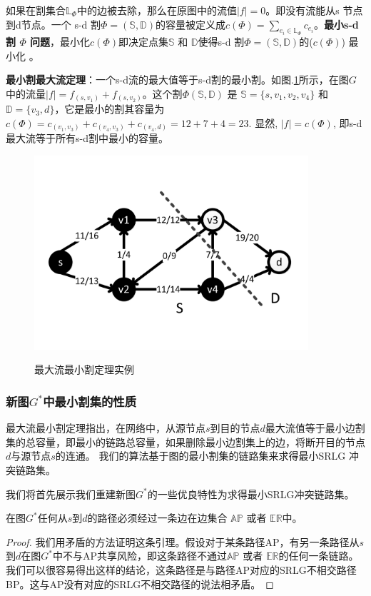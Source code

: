 如果在割集合$\mathbb{\mathbb{L}}_{\Phi}$中的边被去除，那么在原图中的流值$|f| = 0$。即没有流能从s 节点到d节点。一个 s-d 割${\Phi}=(\mathbb{S},\mathbb{D})$的容量被定义成$c(\Phi)=\sum\limits_{e_i\in \mathbb{\mathbb{L}}_{\Phi}}c_{e_i}$。\textbf{最小s-d 割 $\Phi$ 问题}，最小化$c(\Phi)$即决定点集$\mathbb{S}$ 和 $\mathbb{D}$使得s-d 割${\Phi}=(\mathbb{S},\mathbb{D})$的($c(\Phi)$) 最小化 。

\textbf{最小割最大流定理}：一个s-d流的最大值等于s-d割的最小割。如图.\ref{fig:FlowNetwork}所示，在图$G$中的流量$|f|=f_{(s,v_1)}+f_{(s,v_2)}$。这个割$\Phi(\mathbb{S},\mathbb{D})$ 是 $\mathbb{S}=\{s,v_1,v_2,v_4\}$ 和$\mathbb{D}=\{v_3,d\}$，它是最小的割其容量为$c(\Phi)=c_{(v_1,v_3)}+c_{(v_4,v_3)}+c_{(v_4,d)}=12+7+4=23$. 显然, $|f|=c(\Phi)$, 即s-d 最大流等于所有s-d割中最小的容量。
\begin{figure}[htbp]
  \centering
  \includegraphics[width=4.0in]{figures/FlowNetwork}\\
  \caption{最大流最小割定理实例}
  \label{fig:FlowNetwork}
\end{figure}

\subsubsection{新图$G^*$中最小割集的性质}
最大流最小割定理指出，在网络中，从源节点$s$到目的节点$d$最大流值等于最小边割集的总容量，即最小的链路总容量，如果删除最小边割集上的边，将断开目的节点$d$与源节点$s$的连通。 我们的算法基于图的最小割集的链路集来求得最小SRLG 冲突链路集。

我们将首先展示我们重建新图$G^*$的一些优良特性为求得最小SRLG冲突链路集。

\begin{lemma}
\label{le:lemma1}
    在图$G^*$任何从$s$到$d$的路径必须经过一条边在边集合 $\mathbb{AP}$ 或者 $\mathbb{\mathbb{ER}}$中。
\end{lemma}
\begin{proof}
我们用矛盾的方法证明这条引理。假设对于某条路径AP，有另一条路径从$s$到$d$在图$G^*$中不与AP共享风险，即这条路径不通过$\mathbb{AP}$ 或者 $\mathbb{\mathbb{ER}}$的任何一条链路。我们可以很容易得出这样的结论，这条路径是与路径AP对应的SRLG不相交路径BP。这与AP没有对应的SRLG不相交路径的说法相矛盾。
\end{proof}

